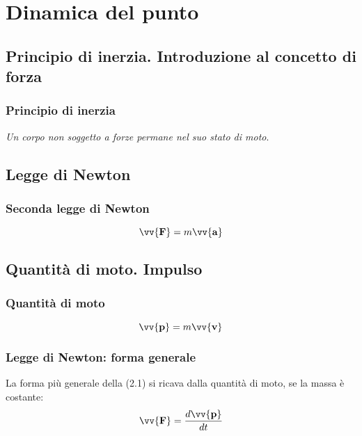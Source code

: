 \documentclass{report}
\newcommand{\vett}[1]{\vv{\boldsymbol{\mathbf{#1}}}}
\begin{document}


\chapter{Dinamica del punto}
\section{Principio di inerzia. Introduzione al concetto di forza}
\subsection{Principio di inerzia}
\emph{Un corpo non soggetto a forze permane nel suo stato di moto}.

\section{Legge di Newton}
\subsection{Seconda legge di Newton}
\begin{equation}
    \vett{F} = m\vett{a}
\end{equation}

\section{Quantità di moto. Impulso}
\subsection{Quantità di moto}
\begin{equation*}
    \vett{p} = m\vett{v}
\end{equation*}

\subsection{Legge di Newton: forma generale}
La forma più generale della (2.1) si ricava dalla quantità di moto,
se la massa è costante:
\begin{equation}
    \vett{F} = \frac{d\vett{p}}{dt}
\end{equation}
\end{document}

